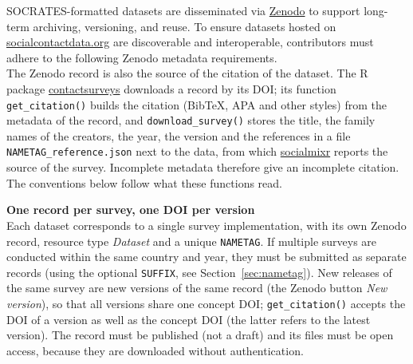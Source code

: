 \documentclass[11pt,a4paper]{article}
\begin{document}
SOCRATES-formatted datasets are disseminated via \href{https://zenodo.org}{Zenodo} to support long-term archiving, versioning, and reuse. 
To ensure datasets hosted on \href{https://socialcontactdata.org}{socialcontactdata.org} are discoverable and interoperable, contributors must adhere to the following Zenodo metadata requirements. \\ 

\noindent The Zenodo record is also the source of the citation of the dataset. The R package \href{https://github.com/epiforecasts/contactsurveys}{contactsurveys} downloads a record by its DOI; its function \texttt{get\_citation()} builds the citation (BibTeX, APA and other styles) from the metadata of the record, and \texttt{download\_survey()} stores the title, the family names of the creators, the year, the version and the references in a file \texttt{NAMETAG\_reference.json} next to the data, from which \href{https://cran.r-project.org/web/packages/socialmixr/index.html}{socialmixr} reports the source of the survey. Incomplete metadata therefore give an incomplete citation. The conventions below follow what these functions read.

\medskip
\noindent \textbf{One record per survey, one DOI per version} \\
Each dataset corresponds to a single survey implementation, with its own Zenodo record, resource type \textit{Dataset} and a unique \texttt{NAMETAG}. If multiple surveys are conducted within the same country and year, they must be submitted as separate records (using the optional \texttt{SUFFIX}, see Section~\ref{sec:nametag}). New releases of the same survey are new versions of the same record (the Zenodo button \textit{New version}), so that all versions share one concept DOI; \texttt{get\_citation()} accepts the DOI of a version as well as the concept DOI (the latter refers to the latest version). The record must be published (not a draft) and its files must be open access, because they are downloaded without authentication.
\end{document}

